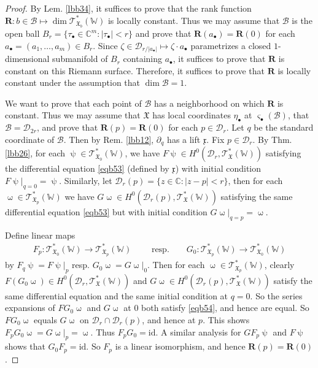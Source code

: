 \documentclass[11pt,b5paper,notitlepage]{article}
\theoremstyle{definition}
\theoremstyle{plain}
\newcommand{\mc}{\mathcal}
\newcommand{\Rbf}{\mathbf{R}}
\newcommand{\scr}{\mathscr}
\newcommand{\xk}{\mathfrak x}
\newcommand{\sgm}{\varsigma}
\newcommand{\blt}{\bullet}
\newcommand{\Wbb}{\mathbb W}
\newcommand{\Cbb}{\mathbb C}
\newcommand{\<}{\left\langle}
\renewcommand{\>}{\right\rangle}
\newcommand{\MB}{\mathcal{B}}
\newcommand{\fx}{\mathfrak{X}}
\newcommand{\MD}{\mathcal{D}}
\newcommand{\id}{\mathrm{id}}
\numberwithin{equation}{subsection}
\begin{document}
\begin{proof}
By Lem. \ref{lbb34}, it suffices to prove that the rank function $\Rbf:b\in\MB\mapsto\dim\scr T_{\fx_b}^*(\Wbb)$ is locally constant. Thus we may assume that $\MB$ is the open ball $B_r=\{\tau_\blt\in\Cbb^m:|\tau_\blt|<r\}$ and prove that $\Rbf(a_\blt)=\Rbf(0)$ for each $a_\blt=(a_1,\dots,a_m)\in B_r$. Since $\zeta\in\mc D_{r/|a_\blt|}\mapsto \zeta\cdot a_\blt$ parametrizes a closed $1$-dimensional submanifold of $B_r$ containing $a_\blt$, it suffices to prove that $\Rbf$ is constant on this Riemann surface. Therefore, it suffices to prove that $\Rbf$ is locally constant under the assumption that $\dim\MB=1$.

We want to prove that each point of $\MB$ has a neighborhood on which $\Rbf$ is constant. Thus we may assume that $\fx$ has local coordinates $\eta_\blt$ at $\sgm_\blt(\MB)$, that $\MB=\mc D_{2r}$, and prove that $\Rbf(p)=\Rbf(0)$ for each $p\in\MD_r$. Let $q$ be the standard coordinate of $\MB$. Then by Rem. \ref{lbb12}, $\partial_q$ has a lift $\xk$.  Fix $p\in\MD_r$. By Thm. \ref{lbb26}, for each $\uppsi\in \scr T_{\fx_0}^*(\Wbb)$, we have $F\uppsi\in H^0(\mc D_r,\scr T_\fx^*(\Wbb))$ satisfying the differential equation \eqref{eqb53} (defined by $\xk$) with initial condition $F\uppsi|_{q=0}=\uppsi$. Similarly, let $\mc D_r(p)=\{z\in\Cbb:|z-p|<r\}$, then for each $\upomega\in\scr T_{\fx_p}^*(\Wbb)$ we have $G\upomega\in H^0(\mc D_r(p),\scr T_\fx^*(\Wbb))$ satisfying the same differential equation \eqref{eqb53} but with initial condition $G\upomega|_{q=p}=\upomega$. 

Define linear maps
\begin{align*}
F_p:\scr T_{\fx_0}^*(\Wbb)\rightarrow\scr T_{\fx_p}^*(\Wbb)\qquad\text{ resp.}\qquad G_0:\scr T_{\fx_p}^*(\Wbb)\rightarrow\scr T_{\fx_0}^*(\Wbb)
\end{align*}
by $F_q\uppsi=F\uppsi|_p$ resp. $G_0\upomega=G\upomega|_0$. Then for each $\upomega\in\scr T_{\fx_p}^*(\Wbb)$, clearly $F(G_0\upomega)\in H^0(\mc D_r,\scr T_\fx^*(\Wbb))$ and $G\upomega\in H^0(\mc D_r(p),\scr T_\fx^*(\Wbb))$ satisfy the same differential equation and the same initial condition at $q=0$. So the series expansions of $FG_0\upomega$ and $G\upomega$ at $0$ both satisfy \eqref{eqb54}, and hence are equal. So $FG_0\upomega$ equals $G\upomega$ on $\mc D_r\cap\mc D_r(p)$, and hence at $p$. This shows $F_pG_0\upomega=G\upomega|_p=\upomega$. Thus $F_pG_0=\id$. A similar analysis for $GF_p\uppsi$ and $F\uppsi$ shows that $G_0F_p=\id$. So $F_p$ is a linear isomorphism, and hence $\Rbf(p)=\Rbf(0)$. 
\end{proof}
\end{document}

